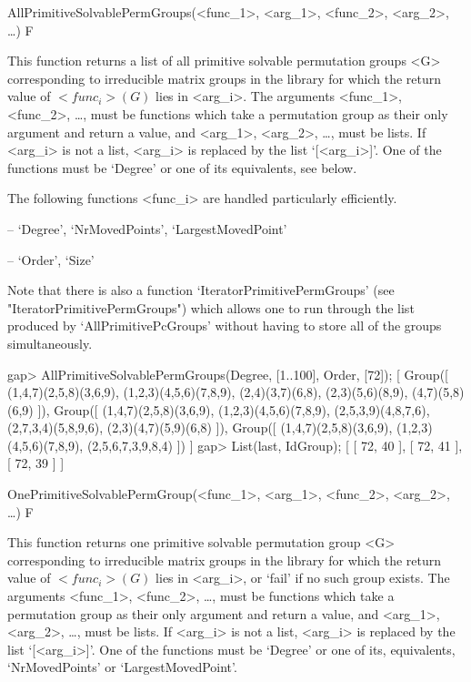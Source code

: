 

\>AllPrimitiveSolvablePermGroups(<func_1>, <arg_1>, <func_2>, <arg_2>, \dots) F

This function returns a list of all primitive solvable permutation
groups <G> corresponding to irreducible matrix groups in the  {\IRREDSOL} library 
for which the return value of $<func_i>(G)$ lies
in <arg_i>.  The arguments <func_1>, <func_2>, \dots,
must be {\GAP} functions which take a permutation group as their only argument and return a
value, and <arg_1>, <arg_2>,
\dots,  must be lists. If <arg_i> is not a list, <arg_i> is replaced by the list
`[<arg_i>]'. One of the functions must be `Degree' or one of its
equivalents, see below.

The following functions <func_i> are handled particularly efficiently. 

\beginlist

\item{--} `Degree', `NrMovedPoints', `LargestMovedPoint'
\item{--} `Order', `Size'
\endlist

Note that there is also a function `IteratorPrimitivePermGroups' (see
"IteratorPrimitivePermGroups") which allows one to run through the list produced by
`AllPrimitivePcGroups' without having to store all of the groups
simultaneously.

\beginexample
gap> AllPrimitiveSolvablePermGroups(Degree, [1..100], Order, [72]);
[ Group([ (1,4,7)(2,5,8)(3,6,9), (1,2,3)(4,5,6)(7,8,9), (2,4)(3,7)(6,8), 
      (2,3)(5,6)(8,9), (4,7)(5,8)(6,9) ]), 
  Group([ (1,4,7)(2,5,8)(3,6,9), (1,2,3)(4,5,6)(7,8,9), (2,5,3,9)(4,8,7,6), 
      (2,7,3,4)(5,8,9,6), (2,3)(4,7)(5,9)(6,8) ]), 
  Group([ (1,4,7)(2,5,8)(3,6,9), (1,2,3)(4,5,6)(7,8,9), (2,5,6,7,3,9,8,4) ]) ]
gap> List(last, IdGroup);
[ [ 72, 40 ], [ 72, 41 ], [ 72, 39 ] ]
\endexample


\>OnePrimitiveSolvablePermGroup(<func_1>, <arg_1>, <func_2>, <arg_2>, \dots) F

This function returns one primitive solvable permutation
group <G> corresponding to irreducible matrix groups in the  {\IRREDSOL} library 
for which the return value of $<func_i>(G)$ lies in
<arg_i>, or `fail' if no such group exists.  The arguments <func_1>, <func_2>, \dots,
must be {\GAP} functions which take a permutation group as their only argument and return a
value, and <arg_1>, <arg_2>,
\dots,  must be lists. If <arg_i> is not a list, <arg_i> is replaced by the list
`[<arg_i>]'. One of the functions must be `Degree' or one of its, equivalents, `NrMovedPoints' or `LargestMovedPoint'.

